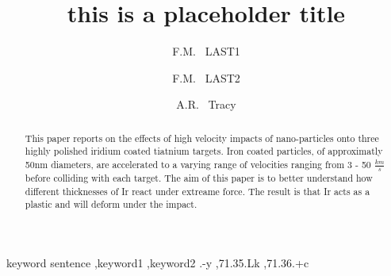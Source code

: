 \documentclass[review]{elsarticle}
\begin{document}
\begin{frontmatter}
	\title{this is a placeholder title}

	\author[tbd1]{F.M. ~LAST1}

	\author[tbd2]{F.M. ~LAST2}

	\author[art,focal]{A.R. ~Tracy}

	\address[tbd1]{Likely LASP's address I would assume, Boulder, Colorado, 80305}
	\address[tbd2]{Likely LASP's address I would assume, Boulder, Colorado, 80305}
	\address[focal]{Likely LASP's address I would assume, Boulder, Colorado, 80305}
	
	
	
	\begin{abstract}
		This paper reports on the effects of high velocity impacts of nano-particles onto three highly polished iridium 
		coated tiatnium targets. Iron coated particles, of approximatly 50nm diameters, are accelerated to a varying range of velocities 
		ranging from 3 - 50 $\frac{km}{s}$ before colliding with each target. The aim of this paper is to better understand
		how different thicknesses of Ir react under extreame force. The result is that Ir acts as a plastic and will deform under
		the impact. 
	\end{abstract}

	\begin{keyword}
		keyword sentence \sep keyword1 \sep keyword2	
		.-y \sep 71.35.Lk \sep 71.36.+c
	\end{keyword}
\end{frontmatter}	
\end{document}

